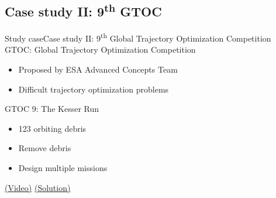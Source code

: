 \documentclass[10pt,compress]{beamer} %
\begin{document}
\subsection{Case study II: 9\textsuperscript{th} GTOC}
\begin{frame}{Study case}{Case study II: 9\textsuperscript{th} Global Trajectory Optimization Competition}
    GTOC: Global Trajectory Optimization Competition
    \begin{itemize}
        \item Proposed by ESA Advanced Concepts Team
        \item Difficult trajectory optimization problems
    \end{itemize}

    GTOC 9: The Kesser Run
    \begin{itemize}
        \item 123 orbiting debris
        \item Remove debris
        \item Design multiple missions
    \end{itemize}
    \href{https://www.youtube.com/watch?v=zvxZx-QnqQ0}{(Video)}
    \href{https://www.youtube.com/watch?v=5CQNG6OIbZM}{(Solution)}
\end{frame}
\end{document}
